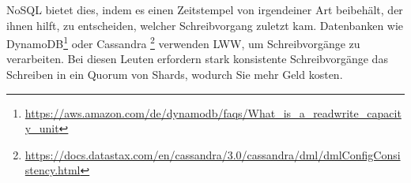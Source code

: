 NoSQL bietet dies, indem es einen Zeitstempel von irgendeiner Art beibehält, der ihnen hilft, zu entscheiden, welcher Schreibvorgang zuletzt kam. Datenbanken wie DynamoDB\footnote{\url{https://aws.amazon.com/de/dynamodb/faqs/What_is_a_readwrite_capacity_unit}} oder Cassandra \footnote{\url{https://docs.datastax.com/en/cassandra/3.0/cassandra/dml/dmlConfigConsistency.html}} verwenden LWW, um Schreibvorgänge zu verarbeiten. Bei diesen Leuten erfordern stark konsistente Schreibvorgänge das Schreiben in ein Quorum von Shards, wodurch Sie mehr Geld kosten.
